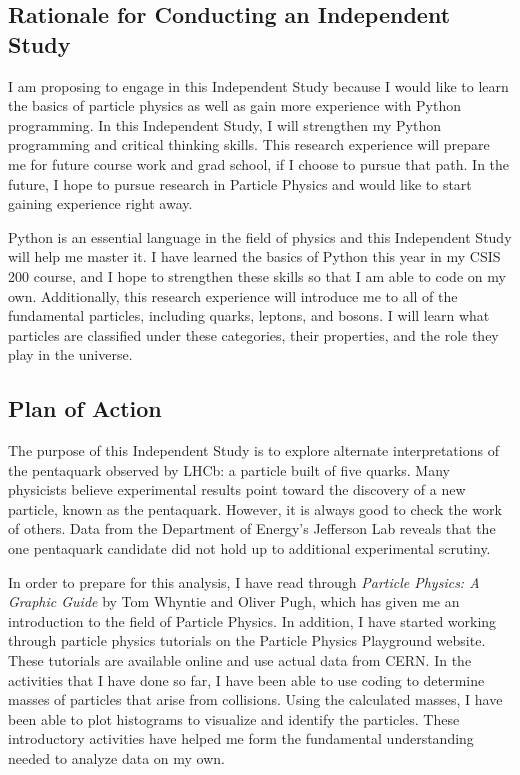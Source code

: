 \documentclass[12pt]{article} %
\begin{document}

\subsection{Rationale for Conducting an Independent Study} %

I am proposing to engage in this Independent Study because I would like to learn the basics of particle physics as well as gain more experience with Python programming.  In this Independent Study, I will strengthen my Python programming and critical thinking skills. This research experience will prepare me for future course work and grad school, if I choose to pursue that path. In the future, I hope to pursue research in Particle Physics and would like to start gaining experience right away. 

Python is an essential language in the field of physics and this Independent Study will help me master it. I have learned the basics of Python this year in my CSIS 200 course, and I hope to strengthen these skills so that I am able to code on my own. Additionally, this research experience will introduce me to all of the fundamental particles, including quarks, leptons, and bosons. I will learn what particles are classified under these categories, their properties, and the role they play in the universe.


\subsection{Plan of Action} %

The purpose of this Independent Study is to explore alternate interpretations of the pentaquark observed by LHCb: a particle built of five quarks. Many physicists believe experimental results point toward the discovery of a new particle, known as the pentaquark. However, it is always good to check the work of others. Data from the Department of Energy's Jefferson Lab reveals that the one pentaquark candidate did not hold up to additional experimental scrutiny. 

In order to prepare for this analysis, I have read through {\it Particle Physics: A Graphic Guide} by Tom Whyntie and Oliver Pugh, which has given me an introduction to the field of Particle Physics. In addition, I have started working through particle physics tutorials on the Particle Physics Playground website. These tutorials are available online and use actual data from CERN. In the activities that I have done so far, I have been able to use coding to determine masses of particles that arise from collisions. Using the calculated masses, I have been able to plot histograms to visualize and identify the particles. These introductory activities have helped me form the fundamental understanding needed to analyze data on my own. 
\end{document}
